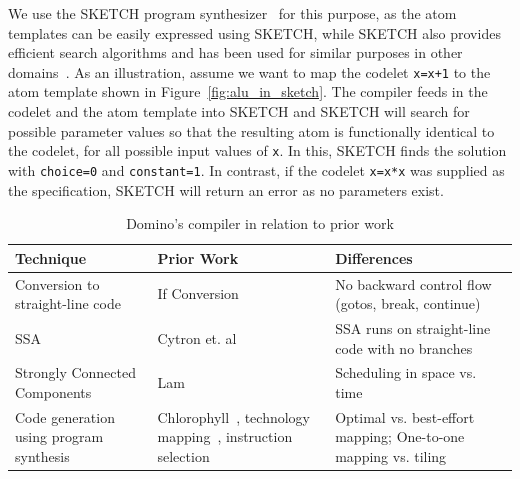 We use the SKETCH program synthesizer~\cite{sketch_asplos} for this purpose, as
the atom templates can be easily expressed using SKETCH, while SKETCH also
provides efficient search algorithms and has been used for similar purposes in
other domains~\cite{bitstreaming, lifejoin, qbs, chlorophyll}.  As an
illustration, assume we want to map the codelet {\tt x=x+1} to the atom
template shown in Figure~\ref{fig:alu_in_sketch}. The \pktlanguage compiler
feeds in the codelet and the atom template into SKETCH and SKETCH will search
for possible parameter values so that the resulting atom is functionally
identical to the codelet, for all possible input values of {\tt x}.  In this,
SKETCH finds the solution with {\tt choice=0} and {\tt constant=1}.  In
contrast, if the codelet {\tt x=x*x} was supplied as the specification, SKETCH
will return an error as no parameters exist.



\begin{table}[!t]
  \begin{scriptsize}
    \begin{tabular}{|p{}|p{}|p{}|}
  \hline
  Technique & Prior Work & Differences \\
  \hline
  Conversion to straight-line code & If Conversion~\cite{if_conversion} & No backward control flow (gotos, break, continue) \\
  \hline
  SSA & Cytron et. al~\cite{ssa} & SSA runs on straight-line code with no branches \\
  \hline
  Strongly Connected Components & Lam~\cite{software_pipelining} & Scheduling in space vs. time \\ %
  \hline
  Code generation using program synthesis & Chlorophyll~\cite{chlorophyll}, technology mapping~\cite{micheli, flowmap, spectransform}, instruction selection~\cite{muchnik} & Optimal vs. best-effort mapping; One-to-one mapping vs. tiling \\
  \hline
  \end{tabular}
  \end{scriptsize}
  \caption{Domino's compiler in relation to prior work}
  \label{tab:prior_compiler}
\end{table}

